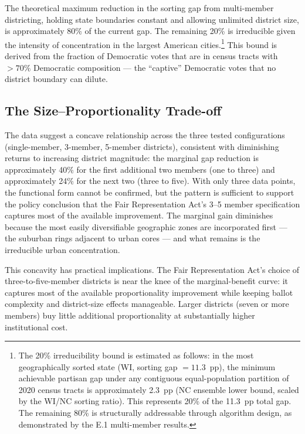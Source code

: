 The theoretical maximum reduction in the sorting gap from multi-member
districting, holding state boundaries constant and allowing unlimited district
size, is approximately 80\% of the current gap.  The remaining 20\% is
irreducible given the intensity of concentration in the largest American
cities.\footnote{The 20\% irreducibility bound is estimated as follows: in the
most geographically sorted state (WI, sorting gap $= 11.3$~pp), the minimum
achievable partisan gap under any contiguous equal-population partition of 2020
census tracts is approximately 2.3~pp \citep{herschlag2020quantifying} (NC
ensemble lower bound, scaled by the WI/NC sorting ratio).  This represents
20\% of the 11.3~pp total gap.  The remaining 80\% is structurally addressable
through algorithm design, as demonstrated by the E.1 multi-member results.}
This bound is derived from the fraction of Democratic votes that are in census
tracts with $>70\%$ Democratic composition --- the ``captive'' Democratic votes
that no district boundary can dilute.

\subsection{The Size--Proportionality Trade-off}

The data suggest a concave relationship across the three tested configurations
(single-member, 3-member, 5-member districts), consistent with diminishing
returns to increasing district magnitude: the marginal gap reduction is
approximately 40\% for the first additional two members (one to three) and
approximately 24\% for the next two (three to five).  With only three data
points, the functional form cannot be confirmed, but the pattern is sufficient
to support the policy conclusion that the Fair Representation Act's 3--5 member
specification captures most of the available improvement.  The marginal gain
diminishes because the most easily diversifiable geographic zones are
incorporated first --- the suburban rings adjacent to urban cores --- and what
remains is the irreducible urban concentration.

This concavity has practical implications.  The Fair Representation Act's
choice of three-to-five-member districts is near the knee of the
marginal-benefit curve: it captures most of the available proportionality
improvement while keeping ballot complexity and district-size effects manageable.
Larger districts (seven or more members) buy little additional proportionality
at substantially higher institutional cost.

